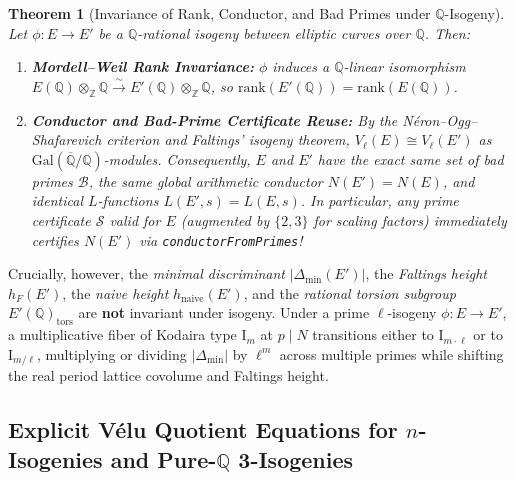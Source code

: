 \documentclass[10pt,a4paper]{article}
\theoremstyle{plain}
\newtheorem{theorem}{Theorem}[section]
\theoremstyle{definition}
\theoremstyle{remark}
\begin{document}
\begin{theorem}[Invariance of Rank, Conductor, and Bad Primes under $\mathbb{Q}$-Isogeny]\label{thm:isogeny_invariance}
Let $\phi: E \to E'$ be a $\mathbb{Q}$-rational isogeny between elliptic curves over $\mathbb{Q}$. Then:
\begin{enumerate}[noitemsep]
    \item \textbf{Mordell--Weil Rank Invariance:} $\phi$ induces a $\mathbb{Q}$-linear isomorphism $E(\mathbb{Q}) \otimes_{\mathbb{Z}} \mathbb{Q} \xrightarrow{\sim} E'(\mathbb{Q}) \otimes_{\mathbb{Z}} \mathbb{Q}$, so $\mathrm{rank}(E'(\mathbb{Q})) = \mathrm{rank}(E(\mathbb{Q}))$.
    \item \textbf{Conductor and Bad-Prime Certificate Reuse:} By the N\'{e}ron--Ogg--Shafarevich criterion and Faltings' isogeny theorem, $V_\ell(E) \cong V_\ell(E')$ as $\mathrm{Gal}(\overline{\mathbb{Q}}/\mathbb{Q})$-modules. Consequently, $E$ and $E'$ have the exact same set of bad primes $\mathcal{B}$, the same global arithmetic conductor $N(E') = N(E)$, and identical $L$-functions $L(E', s) = L(E, s)$. In particular, any prime certificate $\mathcal{S}$ valid for $E$ (augmented by $\{2, 3\}$ for scaling factors) immediately certifies $N(E')$ via \texttt{conductorFromPrimes}!
\end{enumerate}
\end{theorem}

Crucially, however, the \emph{minimal discriminant} $|\Delta_{\min}(E')|$, the \emph{Faltings height} $h_F(E')$, the \emph{naive height} $h_{\text{naive}}(E')$, and the \emph{rational torsion subgroup} $E'(\mathbb{Q})_{\text{tors}}$ are \textbf{not} invariant under isogeny. Under a prime $\ell$-isogeny $\phi: E \to E'$, a multiplicative fiber of Kodaira type $\mathrm{I}_m$ at $p \mid N$ transitions either to $\mathrm{I}_{m \cdot \ell}$ or to $\mathrm{I}_{m / \ell}$, multiplying or dividing $|\Delta_{\min}|$ by $\ell^m$ across multiple primes while shifting the real period lattice covolume and Faltings height.

\subsection{\texorpdfstring{Explicit V\'{e}lu Quotient Equations for $n$-Isogenies and Pure-$\mathbb{Q}$ 3-Isogenies}{Explicit Velu Quotient Equations for n-Isogenies and Pure-Q 3-Isogenies}}
\end{document}
